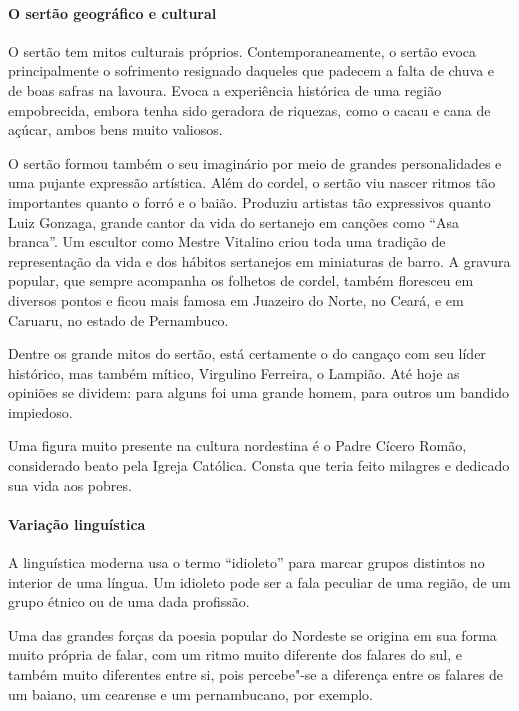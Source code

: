 \documentclass[11pt]{extarticle}
\begin{document}
\paragraph{O sertão geográfico e cultural}

O sertão tem mitos culturais próprios. Contemporaneamente, o sertão evoca
principalmente o sofrimento resignado daqueles que padecem a falta de chuva e
de boas safras na lavoura. Evoca a experiência histórica de uma região
empobrecida, embora tenha sido geradora de riquezas, como o cacau e cana de
açúcar, ambos bens muito valiosos. 

O sertão formou também o seu imaginário por meio de grandes personalidades e
uma pujante expressão artística. Além do cordel, o sertão viu nascer ritmos tão
importantes quanto o forró e o baião. Produziu artistas tão expressivos quanto
Luiz Gonzaga, grande cantor da vida do sertanejo em canções como “Asa branca”.
Um escultor como Mestre Vitalino criou toda uma tradição de representação da
vida e dos hábitos sertanejos em miniaturas de barro. A gravura popular, que
sempre acompanha os folhetos de cordel, também floresceu em diversos pontos e
ficou mais famosa em Juazeiro do Norte, no Ceará, e em Caruaru, no estado de
Pernambuco. 

Dentre os grande mitos do sertão, está certamente o do cangaço com seu líder
histórico, mas também mítico, Virgulino Ferreira, o Lampião. Até hoje as
opiniões se dividem: para alguns foi uma grande homem, para outros um bandido
impiedoso. 

Uma figura muito presente na cultura nordestina é o Padre Cícero Romão,
considerado beato pela Igreja Católica. Consta que teria feito milagres e
dedicado sua vida aos pobres. 

\paragraph{Variação linguística}

A linguística moderna usa o termo “idioleto” para marcar grupos distintos no
interior de uma língua. Um idioleto pode ser a fala peculiar de uma região, de
um grupo étnico ou de uma dada profissão. 

Uma das grandes forças da poesia popular do Nordeste se origina em sua forma
muito própria de falar, com um ritmo muito diferente dos falares do sul, e
também muito diferentes entre si, pois percebe"-se a diferença entre os falares
de um baiano, um cearense e um pernambucano, por exemplo.
\end{document}
